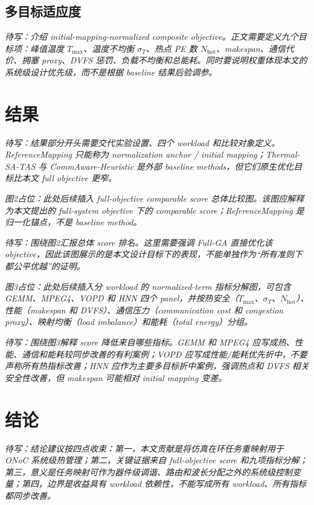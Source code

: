 \documentclass[conference]{IEEEtran}
\begin{document}
\subsection{多目标适应度}

\noindent\textit{待写：介绍 initial-mapping-normalized composite objective。正文需要定义九个目标项：峰值温度 $T_{\max}$、温度不均衡 $\sigma_T$、热点 PE 数 $N_{\mathrm{hot}}$、makespan、通信代价、拥塞 proxy、DVFS 惩罚、负载不均衡和总能耗。同时要说明权重体现本文的系统级设计优先级，而不是根据 baseline 结果后验调参。}

\section{结果}

\noindent\textit{待写：结果部分开头需要交代实验设置、四个 workload 和比较对象定义。ReferenceMapping 只能称为 normalization anchor / initial mapping；Thermal-SA-TAS 与 CommAware-Heuristic 是外部 baseline methods，但它们原生优化目标比本文 full objective 更窄。}

\noindent\textit{图2占位：此处后续插入 full-objective comparable score 总体比较图。该图应解释为本文提出的 full-system objective 下的 comparable score；ReferenceMapping 是归一化锚点，不是 baseline method。}

\noindent\textit{待写：围绕图2汇报总体 score 排名。这里需要强调 Full-GA 直接优化该 objective，因此该图展示的是本文设计目标下的表现，不能单独作为“所有准则下都公平优越”的证明。}

\noindent\textit{图3占位：此处后续插入分 workload 的 normalized-term 指标分解图，可包含 GEMM、MPEG4、VOPD 和 HNN 四个 panel，并按热安全（$T_{\max}$、$\sigma_T$、$N_{\mathrm{hot}}$）、性能（makespan 和 DVFS）、通信压力（communication cost 和 congestion proxy）、映射均衡（load imbalance）和能耗（total energy）分组。}

\noindent\textit{待写：围绕图3解释 score 降低来自哪些指标。GEMM 和 MPEG4 应写成热、性能、通信和能耗较同步改善的有利案例；VOPD 应写成性能/能耗优先折中，不要声称所有热指标改善；HNN 应作为主要多目标折中案例，强调热点和 DVFS 相关安全性改善，但 makespan 可能相对 initial mapping 变差。}

\section{结论}

\noindent\textit{待写：结论建议按四点收束：第一，本文贡献是将仿真在环任务重映射用于 ONoC 系统级热管理；第二，关键证据来自 full-objective score 和九项指标分解；第三，意义是任务映射可作为器件级调谐、路由和波长分配之外的系统级控制变量；第四，边界是收益具有 workload 依赖性，不能写成所有 workload、所有指标都同步改善。}
\end{document}
